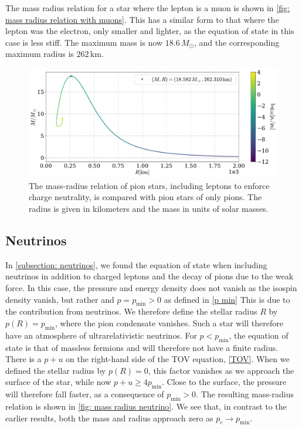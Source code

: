 The mass radius relation for a star where the lepton is a muon is shown in \autoref{fig: mass radius relation with muons}.
This has a similar form to that where the lepton was the electron, only smaller and lighter, as the equation of state in this case is less stiff.
The maximum mass is now $18.6\, M_\odot $, and the corresponding maximum radius is $ 262 \,\text{km}$.

\begin{figure}[!htb]
    \centering
    \includegraphics[width=\textwidth]{../scripts/figurer/pion_star/mass_radius__mu.pdf}
    \caption{
        The mass-radius relation of pion stars, including leptons to enforce charge neutrality, is compared with pion stars of only pions.
        The radius is given in kilometers and the mass in units of solar masses.
        }
        \label{fig: mass radius relation with muons}
\end{figure}



\subsection{Neutrinos}

In \autoref{subsection: neutrinos}, we found the equation of state when including neutrinos in addition to charged leptons and the decay of pions due to the weak force.
In this case, the pressure and energy density does not vanish as the isospin density vanish, but rather and $p = p_\text{min}>0$ as defined in \autoref{p min}
This is due to the contribution from neutrinos.
We therefore define the stellar radius $R$ by $p(R) = p_\text{min}$, where the pion condensate vanishes.
Such a star will therefore have an atmosphere of ultrarelativistic neutrinos.
For $p < p_\text{min}$, the equation of state is that of massless fermions and will therefore not have a finite radius.
There is a $p+u$ on the right-hand side of the TOV equation, \autoref{TOV}.
When we defined the stellar radius by $p(R) = 0$, this factor vanishes as we approach the surface of the star, while now $p+u \geq 4 p_\text{min}$.
Close to the surface, the pressure will therefore fall faster, as a consequence of $p_\text{min}>0$.
The resulting mass-radius relation is shown in \autoref{fig: mass radius neutrino}.
We see that, in contrast to the earlier results, both the mass and radius approach zero as $p_c \rightarrow p_\text{min}$.



